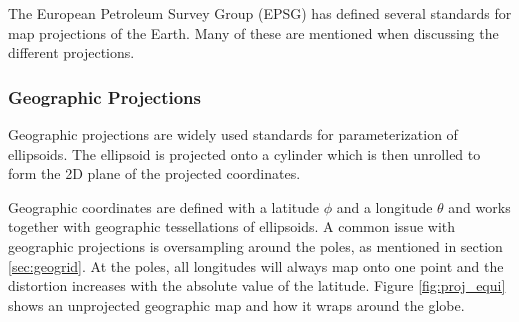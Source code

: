The European Petroleum Survey Group (EPSG) has defined several standards for map projections of the Earth. Many of these are mentioned when discussing the different projections.

\subsubsection{Geographic Projections}

Geographic projections are widely used standards for parameterization of ellipsoids. The ellipsoid is projected onto a cylinder which is then unrolled to form the 2D plane of the projected coordinates.

Geographic coordinates are defined with a latitude $\phi$ and a longitude $\theta$ and works together with geographic tessellations of ellipsoids. A common issue with geographic projections is oversampling around the poles, as mentioned in section \ref{sec:geogrid}. At the poles, all longitudes will always map onto one point and the distortion increases with the absolute value of the latitude. Figure \ref{fig:proj_equi} shows an unprojected geographic map and how it wraps around the globe.

